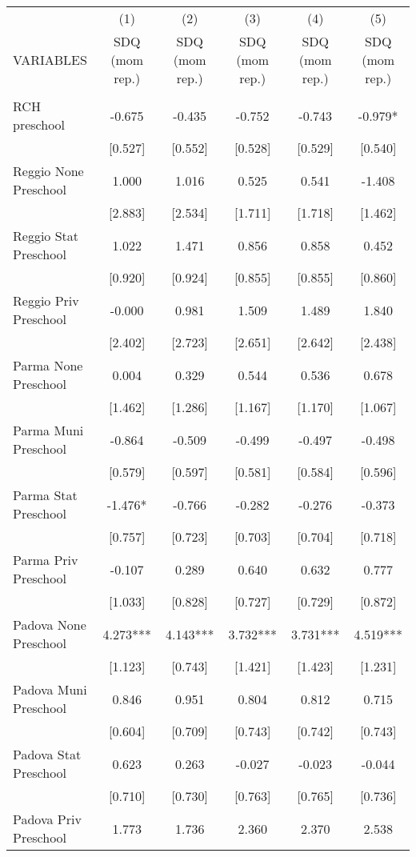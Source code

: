 \begin{tabular}{lccccc} \hline
 & (1) & (2) & (3) & (4) & (5) \\
VARIABLES & SDQ (mom rep.) & SDQ (mom rep.) & SDQ (mom rep.) & SDQ (mom rep.) & SDQ (mom rep.) \\ \hline
 &  &  &  &  &  \\
RCH preschool & -0.675 & -0.435 & -0.752 & -0.743 & -0.979* \\
 & [0.527] & [0.552] & [0.528] & [0.529] & [0.540] \\
Reggio None Preschool & 1.000 & 1.016 & 0.525 & 0.541 & -1.408 \\
 & [2.883] & [2.534] & [1.711] & [1.718] & [1.462] \\
Reggio Stat Preschool & 1.022 & 1.471 & 0.856 & 0.858 & 0.452 \\
 & [0.920] & [0.924] & [0.855] & [0.855] & [0.860] \\
Reggio Priv Preschool & -0.000 & 0.981 & 1.509 & 1.489 & 1.840 \\
 & [2.402] & [2.723] & [2.651] & [2.642] & [2.438] \\
Parma None Preschool & 0.004 & 0.329 & 0.544 & 0.536 & 0.678 \\
 & [1.462] & [1.286] & [1.167] & [1.170] & [1.067] \\
Parma Muni Preschool & -0.864 & -0.509 & -0.499 & -0.497 & -0.498 \\
 & [0.579] & [0.597] & [0.581] & [0.584] & [0.596] \\
Parma Stat Preschool & -1.476* & -0.766 & -0.282 & -0.276 & -0.373 \\
 & [0.757] & [0.723] & [0.703] & [0.704] & [0.718] \\
Parma Priv Preschool & -0.107 & 0.289 & 0.640 & 0.632 & 0.777 \\
 & [1.033] & [0.828] & [0.727] & [0.729] & [0.872] \\
Padova None Preschool & 4.273*** & 4.143*** & 3.732*** & 3.731*** & 4.519*** \\
 & [1.123] & [0.743] & [1.421] & [1.423] & [1.231] \\
Padova Muni Preschool & 0.846 & 0.951 & 0.804 & 0.812 & 0.715 \\
 & [0.604] & [0.709] & [0.743] & [0.742] & [0.743] \\
Padova Stat Preschool & 0.623 & 0.263 & -0.027 & -0.023 & -0.044 \\
 & [0.710] & [0.730] & [0.763] & [0.765] & [0.736] \\
Padova Priv Preschool & 1.773 & 1.736 & 2.360 & 2.370 & 2.538 \\

\end{tabular}
